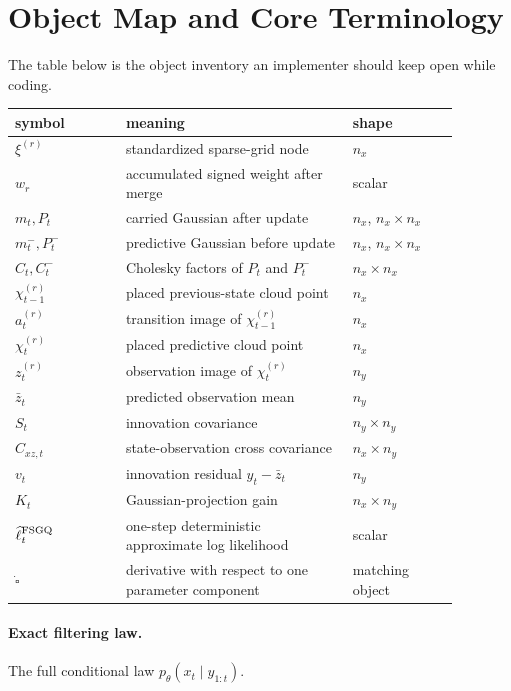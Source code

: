 \documentclass[11pt]{article}
\numberwithin{equation}{section}
\newcommand{\ellhat}{\widehat\ell}
\begin{document}
\section{Object Map and Core Terminology}
\label{sec:object-map}

The table below is the object inventory an implementer should keep open while
coding.

\begin{center}
\small
\begin{tabular}{p{0.22\linewidth}p{0.45\linewidth}p{0.21\linewidth}}
\toprule
symbol & meaning & shape \\
\midrule
\(\xi^{(r)}\) & standardized sparse-grid node & \(n_x\) \\
\(w_r\) & accumulated signed weight after merge & scalar \\
\(m_t,P_t\) & carried Gaussian after update & \(n_x\), \(n_x\times n_x\) \\
\(m_t^-,P_t^-\) & predictive Gaussian before update & \(n_x\), \(n_x\times n_x\) \\
\(C_t,C_t^-\) & Cholesky factors of \(P_t\) and \(P_t^-\) & \(n_x\times n_x\) \\
\(\chi_{t-1}^{(r)}\) & placed previous-state cloud point & \(n_x\) \\
\(a_t^{(r)}\) & transition image of \(\chi_{t-1}^{(r)}\) & \(n_x\) \\
\(\chi_t^{(r)}\) & placed predictive cloud point & \(n_x\) \\
\(z_t^{(r)}\) & observation image of \(\chi_t^{(r)}\) & \(n_y\) \\
\(\bar z_t\) & predicted observation mean & \(n_y\) \\
\(S_t\) & innovation covariance & \(n_y\times n_y\) \\
\(C_{xz,t}\) & state-observation cross covariance & \(n_x\times n_y\) \\
\(v_t\) & innovation residual \(y_t-\bar z_t\) & \(n_y\) \\
\(K_t\) & Gaussian-projection gain & \(n_x\times n_y\) \\
\(\ellhat_t^{\rm FSGQ}\) & one-step deterministic approximate log likelihood & scalar \\
\(\dot{\square}\) & derivative with respect to one parameter component & matching object \\
\bottomrule
\end{tabular}
\end{center}

\paragraph{Exact filtering law.}
The full conditional law \(p_\theta(x_t\mid y_{1:t})\).
\end{document}
